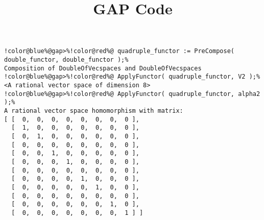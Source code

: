 \documentclass[12pt]{amsart}
\title{GAP Code}
\author{}
\begin{document}
\maketitle

\begin{Verbatim}[commandchars=!@\%,frame=single]
!color@blue%@gap>%!color@red%@ quadruple_functor := PreCompose( double_functor, double_functor );%
Composition of DoubleOfVecspaces and DoubleOfVecspaces
!color@blue%@gap>%!color@red%@ ApplyFunctor( quadruple_functor, V2 );%
<A rational vector space of dimension 8>
!color@blue%@gap>%!color@red%@ ApplyFunctor( quadruple_functor, alpha2 );%
A rational vector space homomorphism with matrix: 
[ [  0,  0,  0,  0,  0,  0,  0,  0 ],
  [  1,  0,  0,  0,  0,  0,  0,  0 ],
  [  0,  1,  0,  0,  0,  0,  0,  0 ],
  [  0,  0,  0,  0,  0,  0,  0,  0 ],
  [  0,  0,  1,  0,  0,  0,  0,  0 ],
  [  0,  0,  0,  1,  0,  0,  0,  0 ],
  [  0,  0,  0,  0,  0,  0,  0,  0 ],
  [  0,  0,  0,  0,  1,  0,  0,  0 ],
  [  0,  0,  0,  0,  0,  1,  0,  0 ],
  [  0,  0,  0,  0,  0,  0,  0,  0 ],
  [  0,  0,  0,  0,  0,  0,  1,  0 ],
  [  0,  0,  0,  0,  0,  0,  0,  1 ] ]
\end{Verbatim}
\end{document}
